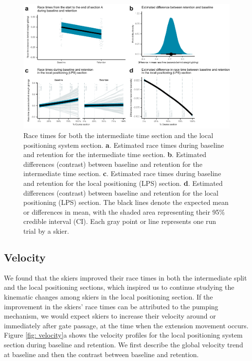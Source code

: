 \documentclass{article}
\begin{document}
\begin{figure}[H]
\centering
\includegraphics{figurer/figure_racetime_2.pdf}
\caption{Race times for both the intermediate time section and the local positioning system section. \textbf{a}. Estimated race times during baseline and retention for the intermediate time section. \textbf{b}. Estimated differences (contrast) between baseline and retention for the intermediate time section. \textbf{c}. Estimated race times during baseline and retention for the local positioning (LPS) section. \textbf{d}. Estimated differences (contrast) between baseline and retention for the local positioning (LPS) section. The black lines denote the expected mean or differences in mean, with the shaded area representing their 95\% credible interval (CI). Each gray point or line represents one run trial by a skier.}\label{fig: racetimes}
\end{figure}

\subsection{Velocity}
We found that the skiers improved their race times in both the intermediate split and the local positioning sections, which inspired us to continue studying the kinematic changes among skiers in the local positioning section. If the improvement in the skiers' race times can be attributed to the pumping mechanism, we would expect skiers to increase their velocity around or immediately after gate passage, at the time when the extension movement occurs.  Figure \ref{fig: velocity}a shows the velocity profiles for the local positioning system section during baseline and retention. We first describe the global velocity trend at baseline and then the contrast between baseline and retention.
\end{document}
